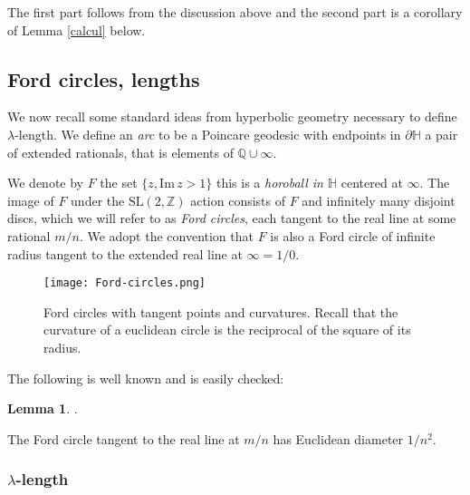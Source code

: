 \documentclass[12pt]{amsart}
\theoremstyle{plain}
\theoremstyle{definition}
\newtheorem{lem}[thm]{Lemma}
\def\HH{\mathbb{H}}
\def\im{\mathrm{Im}\,}
\def\ZZ{\mathbb{Z}}
\def\QQ{\mathbb{Q}}
\def\sl2{\mathrm{SL}(2, \ZZ)}
\begin{document}
The  first part follows from the discussion above and the
second part is a corollary of  Lemma \ref{calcul} below. 



\subsection{Ford circles, lengths} 
\label{lengths}

We now recall some standard ideas from hyperbolic geometry
necessary to define $\lambda$-length.
We define an \textit{arc} to be a Poincare geodesic
with endpoints in $\partial \HH$ a pair of extended rationals, 
that is elements of $\QQ \cup \infty$.

We denote by $F$ the set  $\{ z, \im z > 1\}$
this is a \textit{horoball in $\HH$} centered at $\infty$.
The image of $F$ under the $\sl2$ action consists of
$F$ and infinitely many disjoint discs, 
which we will refer to as \textit{Ford circles}, 
each tangent to the real line at some rational $m/n$.
We adopt the convention that $F$ is also a Ford circle of infinite radius
tangent to the extended real line at $\infty = 1/0$.


  \begin{figure}[ht]
\begin{center}
\texttt{[image: Ford-circles.png]} 
\end{center}
\caption{Ford circles with tangent points and curvatures.
Recall that the 
curvature of a euclidean circle is the reciprocal of the square of its radius.}%
\end{figure}

The following is well known and is easily checked:

\begin{lem}\label{ford}.

The Ford circle tangent to the real line at $m/n$
has Euclidean diameter $1/n^2$.
\end{lem}





\subsubsection{$\lambda$-length}
\end{document}
